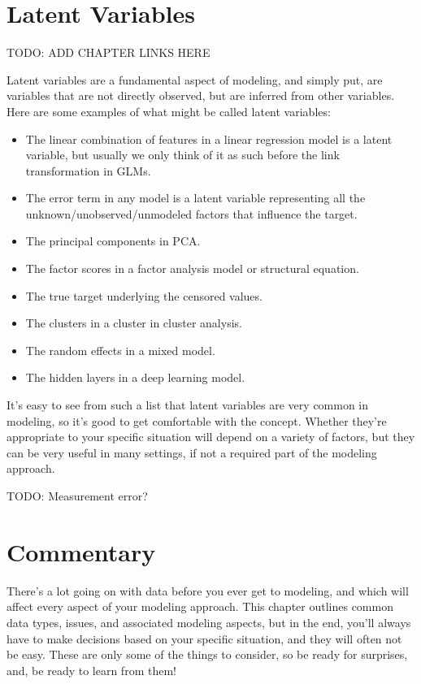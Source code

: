 \documentclass[
  letterpaper,
]{krantz}
\providecommand{\tightlist}{%
  \setlength{\itemsep}{0pt}\setlength{\parskip}{0pt}}\usepackage{longtable,booktabs,array}
\begin{document}
\section{Latent Variables}\label{sec-data-latent}

TODO: ADD CHAPTER LINKS HERE

Latent variables are a fundamental aspect of modeling, and simply put,
are variables that are not directly observed, but are inferred from
other variables. Here are some examples of what might be called latent
variables:

\begin{itemize}
\tightlist
\item
  The linear combination of features in a linear regression model is a
  latent variable, but usually we only think of it as such before the
  link transformation in GLMs.
\item
  The error term in any model is a latent variable representing all the
  unknown/unobserved/unmodeled factors that influence the target.
\item
  The principal components in PCA.
\item
  The factor scores in a factor analysis model or structural equation.
\item
  The true target underlying the censored values.
\item
  The clusters in a cluster in cluster analysis.
\item
  The random effects in a mixed model.
\item
  The hidden layers in a deep learning model.
\end{itemize}

It's easy to see from such a list that latent variables are very common
in modeling, so it's good to get comfortable with the concept. Whether
they're appropriate to your specific situation will depend on a variety
of factors, but they can be very useful in many settings, if not a
required part of the modeling approach.

TODO: Measurement error?

\section{Commentary}\label{commentary-5}

There's a lot going on with data before you ever get to modeling, and
which will affect every aspect of your modeling approach. This chapter
outlines common data types, issues, and associated modeling aspects, but
in the end, you'll always have to make decisions based on your specific
situation, and they will often not be easy. These are only some of the
things to consider, so be ready for surprises, and, be ready to learn
from them!
\end{document}
